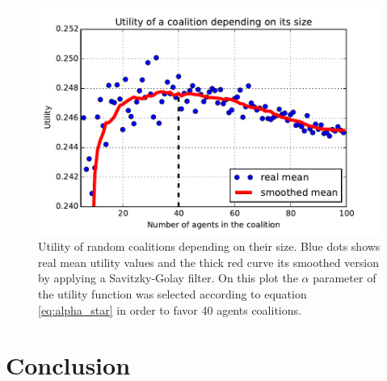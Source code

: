 \documentclass[conference]{IEEEtran}
\begin{document}
\begin{figure}
\includegraphics[scale=.6]{real_utility_2.pdf}
\caption{Utility of random coalitions depending on their size. Blue dots shows real mean utility values and the thick red curve its smoothed version by applying a Savitzky-Golay filter. On this plot the $ \alpha $ parameter of the utility function was selected according to equation \ref{eq:alpha_star} in order to favor 40 agents coalitions.}
\label{fig:real_utility2}
\end{figure}




%
%
\section{Conclusion}
\label{sec:conclusion}


%
%
 
  

\end{document}
